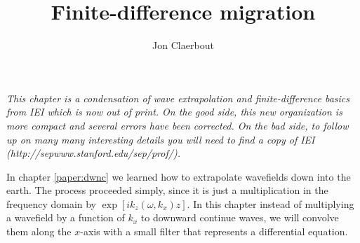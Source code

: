 \def\CAKEDIR{.}
\title{Finite-difference migration}
\author{Jon Claerbout}
\maketitle
\label{paper:fdm}
\def\cn{fdm}    %
\par
{\em 
This chapter is a condensation of
wave extrapolation and finite-difference basics from IEI
which is now out of print.
On the good side,
this new organization is more compact
and several errors have been corrected.
On the bad side,
to follow up on many
many interesting details
you will need to find a copy of IEI
(http://sepwww.stanford.edu/sep/prof/).
}
\par
In chapter \ref{paper:dwnc} we learned how
to extrapolate wavefields down into the earth.
The process proceeded simply, since it is just a multiplication in the
frequency domain by  $\exp [ ik_z ( \omega , k_x ) z ]$.
In this chapter
instead of multiplying a wavefield by a function of $k_x$
to downward continue waves,
we will convolve them along the $x$-axis
with a small filter that represents a differential equation.

